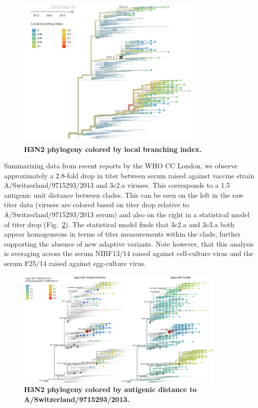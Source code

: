 \documentclass[11pt,oneside,letterpaper]{article}
\begin{document}
\begin{figure}[h!]
	\centering		
	\includegraphics[width=0.8\textwidth]{../figures/sep-2015/H3N2_lbi.png}
	\caption{\textbf{H3N2 phylogeny colored by local branching index.} 
	}
	\label{H3N2_lbi}
\end{figure}

Summarizing data from recent reports by the WHO CC London, we observe approximately a 2.8-fold drop in titer between serum raised against vaccine strain A/Switzerland/9715293/2013 and 3c2.a viruses. This corresponds to a 1.5 antigenic unit distance between clades. This can be seen on the left in the raw titer data (viruses are colored based on titer drop relative to A/Switzerland/9715293/2013 serum) and also on the right in a statistical model of titer drop (Fig.~\ref{H3N2_HI_titers}). The statistical model finds that 3c2.a and 3c3.a both appear homogeneous in terms of titer measurements within the clade, further supporting the absence of new adaptive variants. Note however, that this analysis is averaging across the serum NIBF13/14 raised against cell-culture virus and the serum F25/14 raised against egg-culture virus.

\begin{figure}[h!]
	\centering		
	\includegraphics[width=0.9\textwidth]{../figures/sep-2015/H3N2_HI_titers.png}
	\caption{\textbf{H3N2 phylogeny colored by antigenic distance to A/Switzerland/9715293/2013.} 
	}
	\label{H3N2_HI_titers}
\end{figure}
\end{document}
